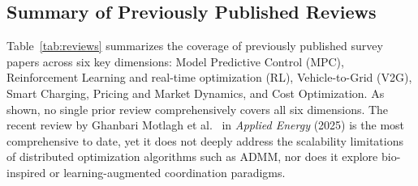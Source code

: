\documentclass[review]{elsarticle}
\begin{document}
\subsection{Summary of Previously Published Reviews}\label{sec:prev_reviews}

\hspace{0.5cm}Table~\ref{tab:reviews} summarizes the coverage of previously published survey papers across six key dimensions: Model Predictive Control (MPC), Reinforcement Learning and real-time optimization (RL), Vehicle-to-Grid (V2G), Smart Charging, Pricing and Market Dynamics, and Cost Optimization. As shown, no single prior review comprehensively covers all six dimensions. The recent review by Ghanbari Motlagh et al.~\cite{motlagh2025applied} in \textit{Applied Energy} (2025) is the most comprehensive to date, yet it does not deeply address the scalability limitations of distributed optimization algorithms such as ADMM, nor does it explore bio-inspired or learning-augmented coordination paradigms.
\end{document}

